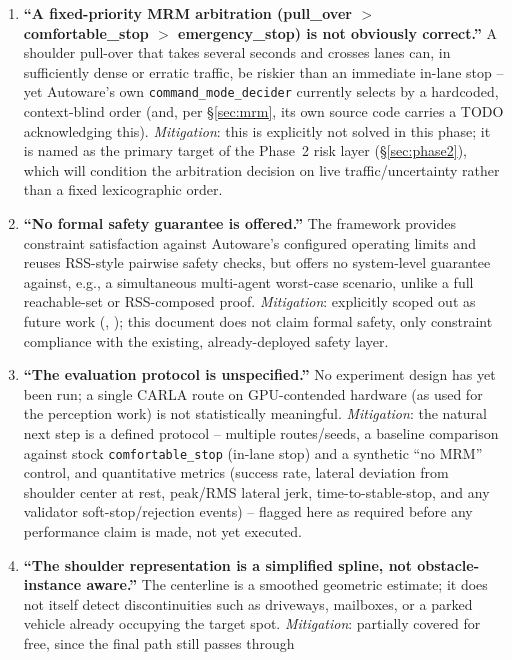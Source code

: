 \documentclass[11pt]{article}
\newcommand{\code}[1]{\texttt{#1}}
\begin{document}
\begin{enumerate}[leftmargin=1.8em]
  \item \textbf{``A fixed-priority MRM arbitration (pull\_over $>$ comfortable\_stop $>$
  emergency\_stop) is not obviously correct.''} A shoulder pull-over that takes several seconds and
  crosses lanes can, in sufficiently dense or erratic traffic, be riskier than an immediate in-lane
  stop -- yet Autoware's own \code{command\_mode\_decider} currently selects by a hardcoded,
  context-blind order (and, per \S\ref{sec:mrm}, its own source code carries a TODO acknowledging
  this). \emph{Mitigation}: this is explicitly not solved in this phase; it is named as the primary
  target of the Phase~2 risk layer (\S\ref{sec:phase2}), which will condition the arbitration
  decision on live traffic/uncertainty rather than a fixed lexicographic order.
  \item \textbf{``No formal safety guarantee is offered.''} The framework provides constraint
  satisfaction against Autoware's configured operating limits and reuses RSS-style pairwise safety
  checks, but offers no system-level guarantee against, e.g., a simultaneous multi-agent
  worst-case scenario, unlike a full reachable-set or RSS-composed proof.
  \emph{Mitigation}: explicitly scoped out as future work (\cite{shalevshwartz2017rss},
  \cite{yang2025reachable}); this document does not claim formal safety, only constraint
  compliance with the existing, already-deployed safety layer.
  \item \textbf{``The evaluation protocol is unspecified.''} No experiment design has yet been run;
  a single CARLA route on GPU-contended hardware (as used for the perception work) is not
  statistically meaningful. \emph{Mitigation}: the natural next step is a defined protocol --
  multiple routes/seeds, a baseline comparison against stock \code{comfortable\_stop} (in-lane
  stop) and a synthetic ``no MRM'' control, and quantitative metrics (success rate, lateral
  deviation from shoulder center at rest, peak/RMS lateral jerk, time-to-stable-stop, and any
  validator soft-stop/rejection events) -- flagged here as required before any performance claim is
  made, not yet executed.
  \item \textbf{``The shoulder representation is a simplified spline, not obstacle-instance
  aware.''} The centerline is a smoothed geometric estimate; it does not itself detect
  discontinuities such as driveways, mailboxes, or a parked vehicle already occupying the target
  spot. \emph{Mitigation}: partially covered for free, since the final path still passes through

\end{enumerate}
\end{document}

